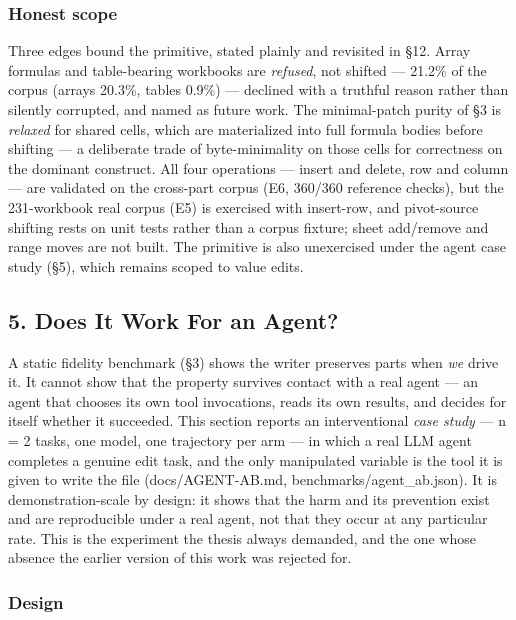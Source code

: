 \documentclass[
]{article}
\begin{document}
\subsubsection{Honest scope}\label{honest-scope}

Three edges bound the primitive, stated plainly and revisited in §12.
Array formulas and table-bearing workbooks are \emph{refused}, not
shifted --- 21.2\% of the corpus (arrays 20.3\%, tables 0.9\%) ---
declined with a truthful reason rather than silently corrupted, and
named as future work. The minimal-patch purity of §3 is \emph{relaxed}
for shared cells, which are materialized into full formula bodies before
shifting --- a deliberate trade of byte-minimality on those cells for
correctness on the dominant construct. All four operations --- insert
and delete, row and column --- are validated on the cross-part corpus
(E6, 360/360 reference checks), but the 231-workbook real corpus (E5) is
exercised with insert-row, and pivot-source shifting rests on unit tests
rather than a corpus fixture; sheet add/remove and range moves are not
built. The primitive is also unexercised under the agent case study
(§5), which remains scoped to value edits.

\subsection{5. Does It Work For an
Agent?}\label{5-does-it-work-for-an-agent}

A static fidelity benchmark (§3) shows the writer preserves parts when
\emph{we} drive it. It cannot show that the property survives contact
with a real agent --- an agent that chooses its own tool invocations,
reads its own results, and decides for itself whether it succeeded. This
section reports an interventional \emph{case study} --- n = 2 tasks, one
model, one trajectory per arm --- in which a real LLM agent completes a
genuine edit task, and the only manipulated variable is the tool it is
given to write the file (docs/AGENT-AB.md, benchmarks/agent\_ab.json).
It is demonstration-scale by design: it shows that the harm and its
prevention exist and are reproducible under a real agent, not that they
occur at any particular rate. This is the experiment the thesis always
demanded, and the one whose absence the earlier version of this work was
rejected for.

\subsubsection{Design}\label{design}
\end{document}
